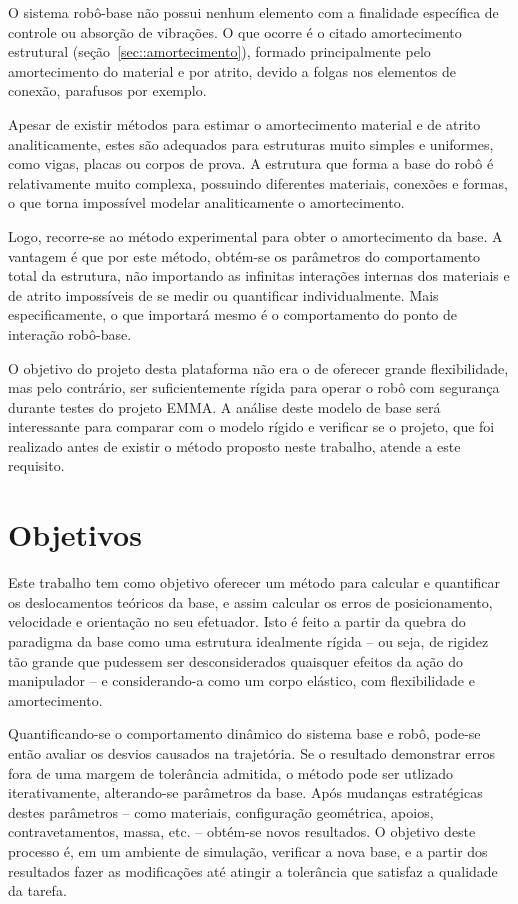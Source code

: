 O sistema robô-base não possui nenhum elemento com a finalidade específica de
controle ou absorção de vibrações. O que ocorre é o citado amortecimento
estrutural (seção~\ref{sec::amortecimento}), formado principalmente pelo
amortecimento do material  e por atrito,
devido a folgas nos elementos de conexão, parafusos por exemplo.

Apesar de existir métodos para estimar o amortecimento material e de atrito
analiticamente, estes são adequados para estruturas muito simples e uniformes,
como vigas, placas ou corpos de prova. A estrutura que forma a base do robô é
relativamente muito complexa, possuindo diferentes materiais, conexões e formas,
o que torna impossível modelar analiticamente o amortecimento.

Logo, recorre-se ao método experimental para obter o amortecimento da base.
A vantagem é que por este método, obtém-se os parâmetros do comportamento total
da estrutura, não importando as infinitas interações internas dos materiais e de
atrito impossíveis de se medir ou quantificar individualmente.
Mais especificamente, o que importará mesmo é o comportamento do ponto de
interação robô-base.


O objetivo do projeto desta plataforma não era o de oferecer grande
flexibilidade, mas pelo contrário, ser suficientemente rígida para operar o robô
com segurança durante testes do projeto EMMA. A análise deste modelo de base
será interessante para comparar com o modelo rígido e verificar se o projeto,
que foi realizado antes de existir o método proposto neste trabalho,
atende a este requisito.


\section{Objetivos}

Este trabalho tem como objetivo oferecer um método para calcular e quantificar
os deslocamentos teóricos da base, e assim calcular os erros de posicionamento,
velocidade e orientação no seu efetuador. Isto é feito a partir da
quebra do paradigma da base como uma estrutura idealmente rígida -- ou seja, de
rigidez tão grande que pudessem ser desconsiderados quaisquer efeitos da ação do
manipulador -- e considerando-a como um corpo elástico, com flexibilidade e
amortecimento.

Quantificando-se o comportamento dinâmico do sistema base e robô, pode-se então
avaliar os desvios causados na trajetória. Se o resultado demonstrar erros fora
de uma margem de tolerância admitida, o método pode ser utlizado iterativamente,
alterando-se parâmetros da base.
Após mudanças estratégicas destes parâmetros -- como materiais, configuração
geométrica, apoios, contravetamentos, massa, etc. -- obtém-se novos resultados.
O objetivo deste processo é, em um ambiente de simulação, verificar a nova base,
e a partir dos resultados fazer as modificações até atingir a tolerância que
satisfaz a qualidade da tarefa.

